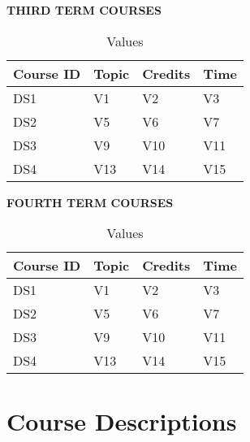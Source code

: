 \documentclass{article}
\begin{document}
\noindent
\textbf{\large THIRD TERM COURSES }\\

\begin{table}[H]
    \caption{Values}
    \label{tab:n}
    \centering
    \begin{tabularx}{\textwidth}{*{4}{X}}
      \toprule
      Course ID & Topic & Credits & Time  \\ 
      \midrule
      DS1 & V1         & V2         & V3         \\ 
      \midrule
      DS2 & V5         & V6         & V7          \\ 
      \midrule
      DS3 & V9         & V10        & V11        \\ 
      \midrule
      DS4 & V13        & V14        & V15        \\
      \bottomrule
    \end{tabularx}
\end{table}

\noindent
\textbf{\large FOURTH TERM COURSES }\\

\begin{table}[H]
    \caption{Values}
    \label{tab:n}
    \centering
    \begin{tabularx}{\textwidth}{*{4}{X}}
      \toprule
      Course ID & Topic & Credits & Time  \\ 
      \midrule
      DS1 & V1         & V2         & V3         \\ 
      \midrule
      DS2 & V5         & V6         & V7          \\ 
      \midrule
      DS3 & V9         & V10        & V11        \\ 
      \midrule
      DS4 & V13        & V14        & V15        \\
      \bottomrule
    \end{tabularx}
\end{table}



\section{Course Descriptions}



\renewcommand{\bibname}{References}

\end{document}
